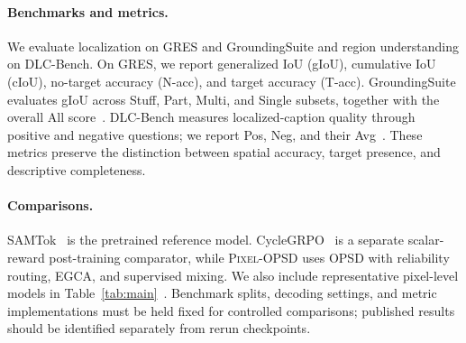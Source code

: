 \documentclass{article}
\newcommand{\ours}{\textsc{Pixel-OPSD}}
\begin{document}
\paragraph{Benchmarks and metrics.}
We evaluate localization on GRES and GroundingSuite and region understanding on DLC-Bench. On GRES, we report generalized IoU (gIoU), cumulative IoU (cIoU), no-target accuracy (N-acc), and target accuracy (T-acc). GroundingSuite evaluates gIoU across Stuff, Part, Multi, and Single subsets, together with the overall All score~\citep{hu2025groundingsuite}. DLC-Bench measures localized-caption quality through positive and negative questions; we report Pos, Neg, and their Avg~\citep{lian2025describeanything}. These metrics preserve the distinction between spatial accuracy, target presence, and descriptive completeness.

\paragraph{Comparisons.}
SAMTok~\citep{zhou2026samtok} is the pretrained reference model. CycleGRPO~\citep{zhang2026cyclegrpo} is a separate scalar-reward post-training comparator, while \ours{} uses OPSD with reliability routing, EGCA, and supervised mixing. We also include representative pixel-level models in Table~\ref{tab:main}~\citep{lai2024lisa,zhou2026samtok}. Benchmark splits, decoding settings, and metric implementations must be held fixed for controlled comparisons; published results should be identified separately from rerun checkpoints.
\end{document}
